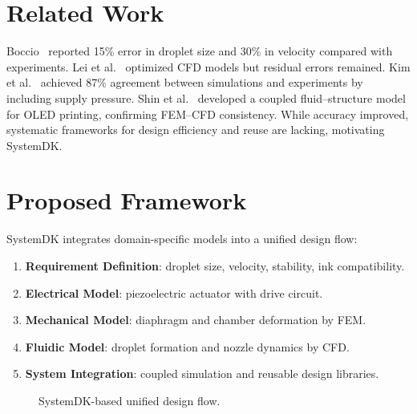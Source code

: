 \documentclass[conference]{IEEEtran}
\begin{document}
\section{Related Work}
Boccio~\cite{boccio2003} reported \mbox{15\%} error in droplet size and \mbox{30\%} in velocity compared with experiments. Lei et al.~\cite{lei2012} optimized CFD models but residual errors remained. Kim et al.~\cite{kim2022} achieved \mbox{87\%} agreement between simulations and experiments by including supply pressure. Shin et al.~\cite{shin2025} developed a coupled fluid--structure model for OLED printing, confirming FEM--CFD consistency. While accuracy improved, systematic frameworks for design efficiency and reuse are lacking, motivating SystemDK.

\section{Proposed Framework}
SystemDK integrates domain-specific models into a unified design flow:
\begin{enumerate}
  \item \textbf{Requirement Definition}: droplet size, velocity, stability, ink compatibility.
  \item \textbf{Electrical Model}: piezoelectric actuator with drive circuit.
  \item \textbf{Mechanical Model}: diaphragm and chamber deformation by FEM.
  \item \textbf{Fluidic Model}: droplet formation and nozzle dynamics by CFD.
  \item \textbf{System Integration}: coupled simulation and reusable design libraries.
\end{enumerate}

\begin{figure}[t]
\centering
{}
\caption{SystemDK-based unified design flow.}
\label{fig:flow}
\end{figure}
\end{document}
